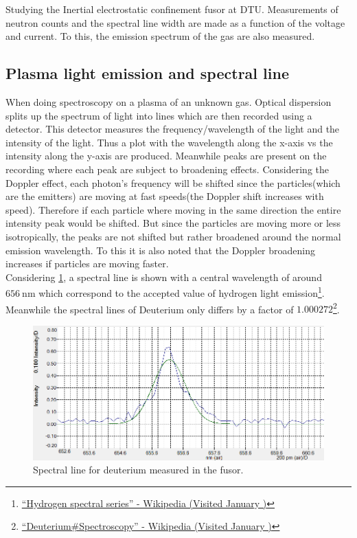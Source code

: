 Studying the Inertial electrostatic confinement fusor at DTU. Measurements of neutron counts and the spectral line width are made as a function of the voltage and current. To this, the emission spectrum of the gas are also measured.
\subsection{Plasma light emission and spectral line}
When doing spectroscopy on a plasma of an unknown gas. Optical dispersion splits up the spectrum of light into lines which are then recorded using a detector. This detector measures the frequency/wavelength of the light and the intensity of the light. Thus a plot with the wavelength along the x-axis vs the intensity along the y-axis are produced. Meanwhile peaks are present on the recording where each peak are subject to broadening effects. Considering the Doppler effect, each photon's frequency will be shifted since the particles(which are the emitters) are moving at fast speeds(the Doppler shift increases with speed). Therefore if each particle where moving in the same direction the entire intensity peak would be shifted. But since the particles are moving more or less isotropically, the peaks are not shifted but rather broadened around the normal emission wavelength. To this it is also noted that the Doppler broadening increases if particles are moving faster.\\
Considering \cref{fig:Spectro}, a spectral line is shown with a central wavelength of around $\SI{656}{\nano\meter}$ which correspond to the accepted value of hydrogen light emission\footnote{\href{https://en.wikipedia.org/wiki/Hydrogen_spectral_series}{``Hydrogen spectral series'' - Wikipedia (Visited January )}}. Meanwhile the spectral lines of Deuterium only differs by a factor of $1.000272$\footnote{\href{https://en.wikipedia.org/wiki/Deuterium#Spectroscopy}{``Deuterium\#Spectroscopy'' - Wikipedia (Visited January )}}.
\begin{figure}
	\centering
	\includegraphics[width=\textwidth]{Figures/D_linje.png}
	\caption{Spectral line for deuterium measured in the fusor.}
	\label{fig:Spectro}
\end{figure}
